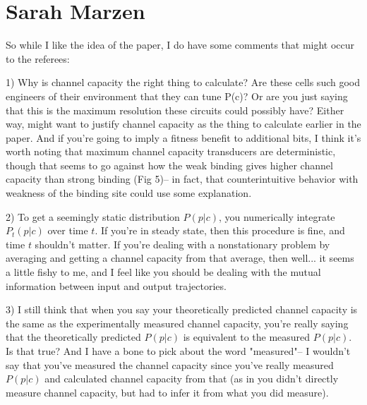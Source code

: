 \section{Sarah Marzen}

So while I like the idea of the paper, I do have some comments that might occur
to the referees:

\begin{tcolorbox}
1)  Why is channel capacity the right thing to calculate?  Are these cells such
good engineers of their environment that they can tune P(c)?  Or are you just
saying that this is the maximum resolution these circuits could possibly have?
Either way, might want to justify channel capacity as the thing to calculate
earlier in the paper.  And if you're going to imply a fitness benefit to
additional bits, I think it's worth noting that maximum channel capacity
transducers are deterministic, though that seems to go against how the weak
binding gives higher channel capacity than strong binding (Fig 5)-- in fact,
that counterintuitive behavior with weakness of the binding site could use some
explanation.
\end{tcolorbox}

\begin{tcolorbox}
2)  To get a seemingly static distribution $P(p|c)$, you numerically integrate
$P_t(p|c)$ over time $t$.  If you're in steady state, then this procedure is
fine, and time $t$ shouldn't matter.  If you're dealing with a nonstationary
problem by averaging and getting a channel capacity from that average, then
well... it seems a little fishy to me, and I feel like you should be dealing
with the mutual information between input and output trajectories.
\end{tcolorbox}

\begin{tcolorbox}
3)  I still think that when you say your theoretically predicted channel
capacity is the same as the experimentally measured channel capacity, you're
really saying that the theoretically predicted $P(p|c)$ is equivalent to the
measured $P(p|c)$.  Is that true?  And I have a bone to pick about the word
"measured"-- I wouldn't say that you've measured the channel capacity since
you've really measured $P(p|c)$ and calculated channel capacity from that (as in
you didn't directly measure channel capacity, but had to infer it from what you
did measure).
\end{tcolorbox}
